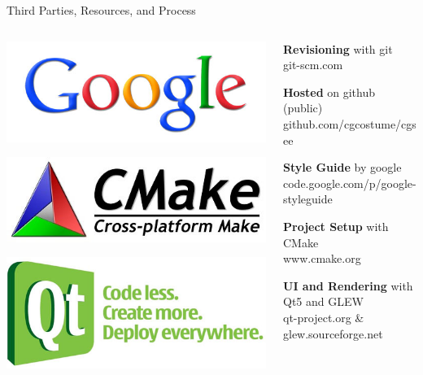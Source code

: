 \begin{frame}{Third Parties, Resources, and Process}
\begin{columns}
\begin{column}{0.12\textwidth}
			\includegraphics[width=\textwidth]{intro/google}
			\smallskip
			
			\includegraphics[width=\textwidth]{intro/cmake}
			\medskip
			
			\includegraphics[width=\textwidth]{intro/qt}

		\end{column}
		\begin{column}{0.8\textwidth}

			\textbf{Revisioning} with git\\
			git-scm.com\bigskip
			
			\textbf{Hosted} on github (public)\\
			github.com/cgcostume/cgsee\bigskip

			\textbf{Style Guide} by google\\
			code.google.com/p/google-styleguide\bigskip
			
			\textbf{Project Setup} with CMake\\
			www.cmake.org\bigskip

			\textbf{UI and Rendering} with Qt5 and GLEW\\
			qt-project.org \& glew.sourceforge.net

		\end{column}

	\end{columns}
	
\end{frame}


